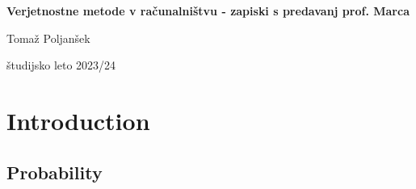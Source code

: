 \documentclass[a4paper, 12pt]{book}
\title{\ttitle}
\author{\tauthor}
\date{\tdate}
\newcommand{\ttitle}{Verjetnostne metode v računalništvu - zapiski s predavanj prof. Marca}
\newcommand{\tauthor}{Tomaž Poljanšek}
\newcommand{\tdate}{študijsko leto 2023/24}
\theoremstyle{definition}
\theoremstyle{remark}
\newcommand\mymaketitle{
  \begin{titlepage}
    \begin{center}
        \vspace*{4cm}
        \Huge
        \textbf{\ttitle}
                        
        \vspace{1.5cm}
        \huge
        \tauthor
            
        \vspace{3cm}
        \Large
        \tdate
    \end{center}
  \end{titlepage}
}
\begin{document}
\renewcommand{\thepage}{}
\newcommand{\sn}[1]{"`#1"'}

\mymaketitle

\clearpage

\frontmatter

\pagestyle{empty}
\def\thepage{}
\tableofcontents{}

\def\x{\hspace{3ex}}    %
\def\y{\hspace{2.45ex}}  %
\def\z{\hspace{1.9ex}}    %
\stackMath





\mainmatter
\setcounter{page}{1}
\pagestyle{fancy}




\chapter{Introduction}


\section{Probability}
\end{document}
